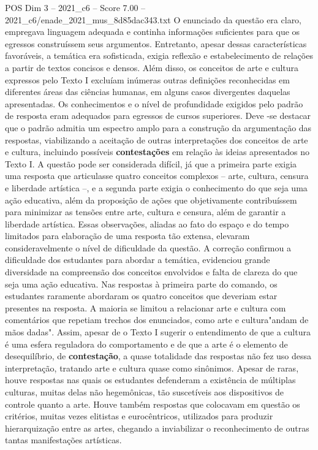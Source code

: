 \begin{textsample}{POS Dim 3 – 2021\_c6 – Score 7.00 – 2021\_c6/enade\_2021\_mus\_8d85dac343.txt}
O enunciado da questão era claro, empregava linguagem adequada e continha informações suficientes para que os egressos construíssem seus argumentos.
Entretanto, apesar dessas características favoráveis, a temática era sofisticada, exigia reflexão e estabelecimento de relações a partir de textos concisos e densos.
Além disso, os conceitos de arte e cultura expressos pelo Texto I excluíam inúmeras outras definições reconhecidas em diferentes áreas das ciências humanas, em alguns casos divergentes daquelas apresentadas.
Os conhecimentos e o nível de profundidade exigidos pelo padrão de resposta eram adequados para egressos de cursos superiores.
Deve -se destacar que o padrão admitia um espectro amplo para a construção da argumentação das respostas, viabilizando a aceitação de outras interpretações dos conceitos de arte e cultura, incluindo possíveis \textbf{contestações} em relação às ideias apresentados no Texto I.
A questão pode ser considerada difícil, já que a primeira parte exigia uma resposta que articulasse quatro conceitos complexos – arte, cultura, censura e liberdade artística –, e a segunda parte exigia o conhecimento do que seja uma ação educativa, além da proposição de ações que objetivamente contribuíssem para minimizar as tensões entre arte, cultura e censura, além de garantir a liberdade artística.
Essas observações, aliadas ao fato do espaço e do tempo limitados para elaboração de uma resposta tão extensa, elevaram consideravelmente o nível de dificuldade da questão.
A correção confirmou a dificuldade dos estudantes para abordar a temática, evidenciou grande diversidade na compreensão dos conceitos envolvidos e falta de clareza do que seja uma ação educativa.
Nas respostas à primeira parte do comando, os estudantes raramente abordaram os quatro conceitos que deveriam estar presentes na resposta.
A maioria se limitou a relacionar arte e cultura com comentários que repetiam trechos dos enunciados, como arte e cultura"andam de mãos dadas".
Assim, apesar de o Texto I sugerir o entendimento de que a cultura é uma esfera reguladora do comportamento e de que a arte é o elemento de desequilíbrio, de \textbf{contestação}, a quase totalidade das respostas não fez uso dessa interpretação, tratando arte e cultura quase como sinônimos.
Apesar de raras, houve respostas nas quais os estudantes defenderam a existência de múltiplas culturas, muitas delas não hegemônicas, tão suscetíveis aos dispositivos de controle quanto a arte.
Houve também respostas que colocavam em questão os critérios, muitas vezes elitistas e eurocêntricos, utilizados para produzir hierarquização entre as artes, chegando a inviabilizar o reconhecimento de outras tantas manifestações artísticas.

\end{textsample}
